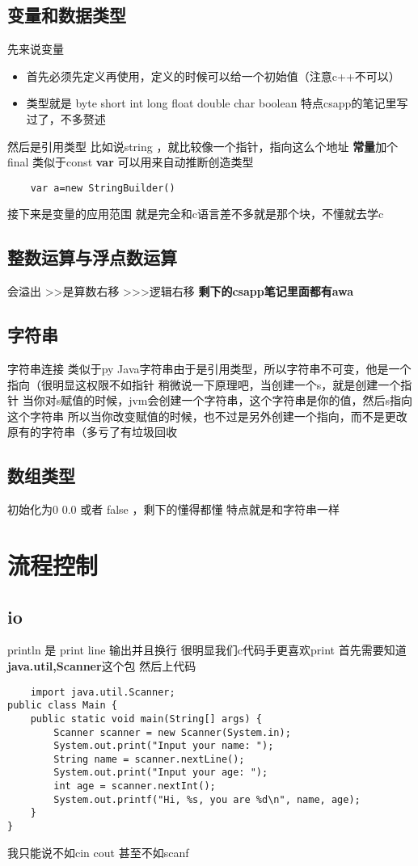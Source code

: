 \documentclass[a4paper,12pt]{ctexbook}
\begin{document}
\subsection{变量和数据类型}
先来说变量
\begin{itemize}
    \item 首先必须先定义再使用，定义的时候可以给一个初始值（注意c++不可以）
    \item 类型就是 byte short int long float double char boolean 特点csapp的笔记里写过了，不多赘述
\end{itemize}
然后是引用类型 比如说string ，就比较像一个指针，指向这么个地址
\textbf{常量}加个final 类似于const
\textbf{var} 可以用来自动推断创造类型
\begin{lstlisting}
    var a=new StringBuilder() 
\end{lstlisting}
接下来是变量的应用范围
就是完全和c语言差不多就是那个{}块，不懂就去学c
\subsection{整数运算与浮点数运算}
会溢出 >>是算数右移 >>>逻辑右移 \textbf{剩下的csapp笔记里面都有awa}
\subsection{字符串}
字符串连接 类似于py
Java字符串由于是引用类型，所以字符串不可变，他是一个指向（很明显这权限不如指针
稍微说一下原理吧，当创建一个s，就是创建一个指针
当你对s赋值的时候，jvm会创建一个字符串，这个字符串是你的值，然后s指向这个字符串
所以当你改变赋值的时候，也不过是另外创建一个指向，而不是更改原有的字符串（多亏了有垃圾回收
\subsection{数组类型}
初始化为0 0.0 或者 false ，剩下的懂得都懂
特点就是和字符串一样
\section{流程控制}
\subsection{io}
println 是 print line 输出并且换行
很明显我们c代码手更喜欢print 
首先需要知道\textbf{java.util,Scanner}这个包
然后上代码
\begin{lstlisting}
    import java.util.Scanner;
public class Main {
    public static void main(String[] args) {
        Scanner scanner = new Scanner(System.in); 
        System.out.print("Input your name: "); 
        String name = scanner.nextLine(); 
        System.out.print("Input your age: "); 
        int age = scanner.nextInt(); 
        System.out.printf("Hi, %s, you are %d\n", name, age); 
    }
}
\end{lstlisting}
我只能说不如cin cout 甚至不如scanf
\end{document}
